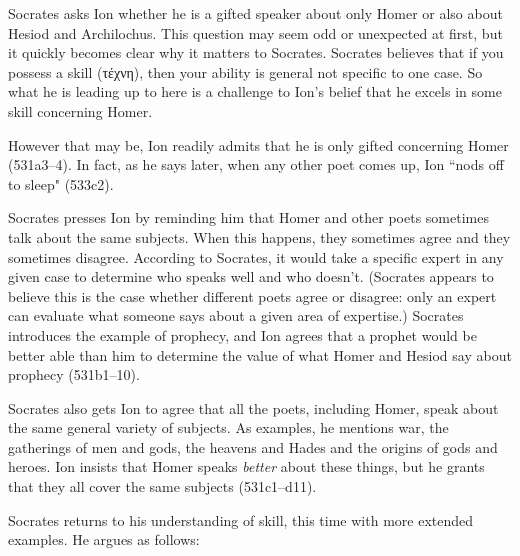 \documentclass[12pt,letterpaper]{article}
\begin{document}
Socrates asks Ion whether he is a gifted speaker about only Homer or also about Hesiod and Archilochus. This question may seem odd or unexpected at first, but it quickly becomes clear why it matters to Socrates. Socrates believes that if you possess a skill (\textgreek{τέχνη}), then your ability is general not specific to one case. So what he is leading up to here is a challenge to Ion's belief that he excels in some skill concerning Homer.

However that may be, Ion readily admits that he is only gifted concerning Homer (531a3--4). In fact, as he says later, when any other poet comes up, Ion ``nods off to sleep" (533c2).

Socrates presses Ion by reminding him that Homer and other poets sometimes talk about the same subjects. When this happens, they sometimes agree and they sometimes disagree. According to Socrates, it would take a specific expert in any given case to determine who speaks well and who doesn't. (Socrates appears to believe this is the case whether different poets agree or disagree: only an expert can evaluate what someone says about a given area of expertise.) Socrates introduces the example of prophecy, and Ion agrees that a prophet would be better able than him to determine the value of what Homer and Hesiod say about prophecy (531b1--10).

Socrates also gets Ion to agree that all the poets, including Homer, speak about the same general variety of subjects. As examples, he mentions war, the gatherings of men and gods, the heavens and Hades and the origins of gods and heroes. Ion insists that Homer speaks \emph{better} about these things, but he grants that they all cover the same subjects (531c1--d11).

Socrates returns to his understanding of skill, this time with more extended examples. He argues as follows:
\end{document}
